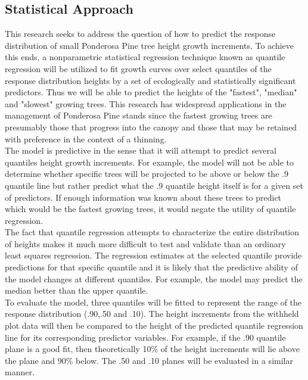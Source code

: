 \documentclass[11pt, letterpaper, fleqn]{article}
\begin{document}
\subsection{Statistical Approach}

This research seeks to address the question of how to predict the response distribution of small Ponderosa Pine tree height growth increments.  To achieve this ends, a nonparametric statistical regression technique known as quantile regression will be utilized to fit growth curves over select quantiles of the response distribution heights by a set of ecologically and statistically significant predictors. Thus we will be able to predict the heights of the "fastest", "median" and "slowest" growing trees.
This research has widespread applications in the management of Ponderosa Pine stands since the fastest growing trees are
presumably those that progress into the canopy and those that may be retained with preference in the context of a thinning.\\[2pt]

The model is predictive in the sense that it will attempt to predict several quantiles height growth increments. For example, the model will not be able to determine whether specific trees will be projected to be above or below the .9 quantile line but rather predict what the .9 quantile height itself is for a given set of predictors. If enough information was known about these trees to predict which would be the fastest growing trees, it would negate the utility of quantile regression.\\[2pt]

The fact that quantile regression attempts to characterize the entire distribution of heights makes it much more difficult to test and validate than an ordinary least squares regression.  The regression estimates at the selected quantile provide predictions for that specific quantile and it is likely that the predictive ability of the model changes at different quantiles.  For example, the model may predict the median better than the upper quantile. \\[2pt]

To evaluate the model, three quantiles will be fitted to represent the range of the response distribution (.90,.50 and .10).  The height increments from the withheld plot data will then be compared to the height of the predicted quantile regression line for its corresponding predictor variables.  For example, if the .90 quantile plane is a good fit, then theoretically 10\% of the height increments will lie above the plane and 90\% below.  The .50 and .10 planes will be evaluated in a similar manner. \\[2pt]
\end{document}
